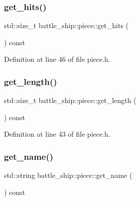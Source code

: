 \subsubsection{\texorpdfstring{get\+\_\+hits()}{get\_hits()}}
{\footnotesize\ttfamily std\+::size\+\_\+t battle\+\_\+ship\+::piece\+::get\+\_\+hits (\begin{DoxyParamCaption}{ }\end{DoxyParamCaption}) const\hspace{0.3cm}{\ttfamily [inline]}}



Definition at line 46 of file piece.\+h.

\mbox{\label{classbattle__ship_1_1piece_aef2b0dd02984f6377a759548da918ace}} 
\subsubsection{\texorpdfstring{get\+\_\+length()}{get\_length()}}
{\footnotesize\ttfamily std\+::size\+\_\+t battle\+\_\+ship\+::piece\+::get\+\_\+length (\begin{DoxyParamCaption}{ }\end{DoxyParamCaption}) const\hspace{0.3cm}{\ttfamily [inline]}}



Definition at line 43 of file piece.\+h.

\mbox{\label{classbattle__ship_1_1piece_acb14495f784dfb6dd382c107e592908c}} 
\subsubsection{\texorpdfstring{get\+\_\+name()}{get\_name()}}
{\footnotesize\ttfamily std\+::string battle\+\_\+ship\+::piece\+::get\+\_\+name (\begin{DoxyParamCaption}{ }\end{DoxyParamCaption}) const\hspace{0.3cm}{\ttfamily [inline]}}



